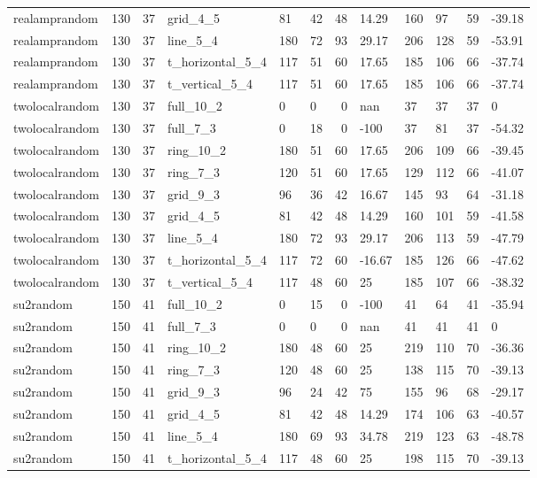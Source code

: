 \begin{longtable}{lrrlllrlllrl}
realamprandom & 130 & 37 & grid\_4\_5 & 81 & 42 & 48 & 14.29 & 160 & 97 & 59 & -39.18 \\
realamprandom & 130 & 37 & line\_5\_4 & 180 & 72 & 93 & 29.17 & 206 & 128 & 59 & -53.91 \\
realamprandom & 130 & 37 & t\_horizontal\_5\_4 & 117 & 51 & 60 & 17.65 & 185 & 106 & 66 & -37.74 \\
realamprandom & 130 & 37 & t\_vertical\_5\_4 & 117 & 51 & 60 & 17.65 & 185 & 106 & 66 & -37.74 \\
twolocalrandom & 130 & 37 & full\_10\_2 & 0 & 0 & 0 & nan & 37 & 37 & 37 & 0 \\
twolocalrandom & 130 & 37 & full\_7\_3 & 0 & 18 & 0 & -100 & 37 & 81 & 37 & -54.32 \\
twolocalrandom & 130 & 37 & ring\_10\_2 & 180 & 51 & 60 & 17.65 & 206 & 109 & 66 & -39.45 \\
twolocalrandom & 130 & 37 & ring\_7\_3 & 120 & 51 & 60 & 17.65 & 129 & 112 & 66 & -41.07 \\
twolocalrandom & 130 & 37 & grid\_9\_3 & 96 & 36 & 42 & 16.67 & 145 & 93 & 64 & -31.18 \\
twolocalrandom & 130 & 37 & grid\_4\_5 & 81 & 42 & 48 & 14.29 & 160 & 101 & 59 & -41.58 \\
twolocalrandom & 130 & 37 & line\_5\_4 & 180 & 72 & 93 & 29.17 & 206 & 113 & 59 & -47.79 \\
twolocalrandom & 130 & 37 & t\_horizontal\_5\_4 & 117 & 72 & 60 & -16.67 & 185 & 126 & 66 & -47.62 \\
twolocalrandom & 130 & 37 & t\_vertical\_5\_4 & 117 & 48 & 60 & 25 & 185 & 107 & 66 & -38.32 \\
su2random & 150 & 41 & full\_10\_2 & 0 & 15 & 0 & -100 & 41 & 64 & 41 & -35.94 \\
su2random & 150 & 41 & full\_7\_3 & 0 & 0 & 0 & nan & 41 & 41 & 41 & 0 \\
su2random & 150 & 41 & ring\_10\_2 & 180 & 48 & 60 & 25 & 219 & 110 & 70 & -36.36 \\
su2random & 150 & 41 & ring\_7\_3 & 120 & 48 & 60 & 25 & 138 & 115 & 70 & -39.13 \\
su2random & 150 & 41 & grid\_9\_3 & 96 & 24 & 42 & 75 & 155 & 96 & 68 & -29.17 \\
su2random & 150 & 41 & grid\_4\_5 & 81 & 42 & 48 & 14.29 & 174 & 106 & 63 & -40.57 \\
su2random & 150 & 41 & line\_5\_4 & 180 & 69 & 93 & 34.78 & 219 & 123 & 63 & -48.78 \\
su2random & 150 & 41 & t\_horizontal\_5\_4 & 117 & 48 & 60 & 25 & 198 & 115 & 70 & -39.13 \\

\end{longtable}
